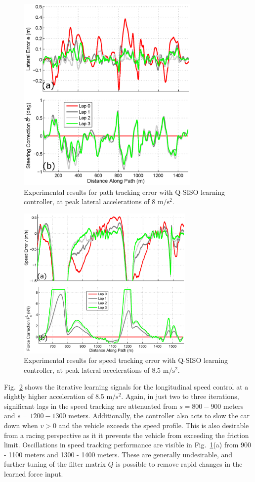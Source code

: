 \documentclass[9pt,shortpaper,twoside,web]{ieeecolor}
\begin{document}
{{{\begin{figure}[h!]
\centering
\includegraphics[width=3.5in]{figures/expRes1.eps}
\caption{Experimental results for path tracking error with Q-SISO learning controller, at peak lateral accelerations of 8 $\mathrm{m/s^2}$.}
\label{fig:expRes1}
\end{figure}

\begin{figure}
\centering
\includegraphics[width=3.4in]{figures/expRes2.eps}
\caption{Experimental results for speed tracking error with Q-SISO learning controller, at peak lateral accelerations of 8.5 $\mathrm{m/s^2}$.}
\label{fig:expRes2}
\end{figure}
Fig.~\ref{fig:expRes2} shows the iterative learning signals for the longitudinal speed control at a slightly
higher acceleration of 8.5 $\mathrm{m/s^2}$. Again, in just
two to three iterations, significant lags in the speed tracking are attenuated from $s = 800-900$ meters and $s = 1200-1300$ meters. Additionally, the controller also acts to slow the car down when $v > 0$ and the vehicle exceeds the speed profile. This is also desirable
from a racing perspective as it it prevents the vehicle from exceeding the friction limit. Oscillations in speed tracking
performance are visible in Fig.~\ref{fig:expRes1}(a) from 900 - 1100 meters and 1300 - 1400 meters. These are generally undesirable, and further tuning of the filter matrix $Q$ is possible
to remove rapid changes in the learned force input. 
 
}}}
\end{document}

